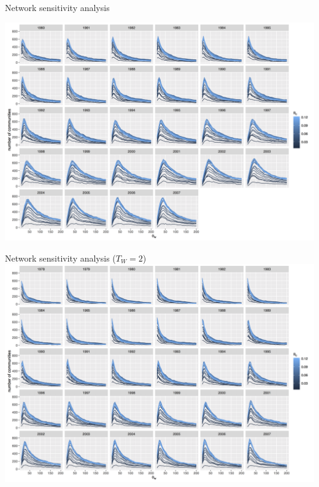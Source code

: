 \documentclass{beamer}
\begin{document}
\begin{frame}{Network sensitivity analysis}
\label{slide:sensitivity}
\hyperlink{slide:relevance}{}

	\includegraphics[width=\textwidth]{figures/commnum_thetaw_byyears.png}
\end{frame}


\begin{frame}{Network sensitivity analysis ($T_W = 2$)}
	\includegraphics[width=\textwidth]{figures/commnum_thetaw_byyears_window3.png}
\end{frame}
\end{document}
